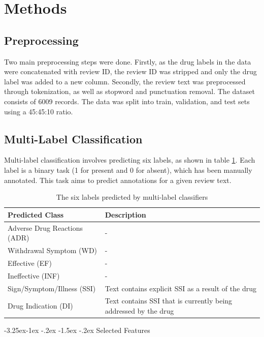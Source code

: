 \documentclass[10.7pt, twocolumn]{article}
\makeatletter
\renewcommand\subsubsection{\@startsection{subsubsection}{3}{\z@}%
	{-3.25ex\@plus -1ex \@minus -.2ex}%
    {-1.5ex \@plus -.2ex}%
    {\normalfont\itshape}}
\makeatother
\begin{document}
\section{Methods}\label{methods}
\subsection{Preprocessing}
Two main preprocessing steps were done. Firstly, as the drug labels in the data were concatenated with review ID, the review ID was stripped and only the drug label was added to a new column. Secondly, the review text was preprocessed through tokenization, as well as stopword and punctuation removal. The dataset consists of 6009 records. The data was split into train, validation, and test sets using a 45:45:10 ratio.
\subsection{Multi-Label Classification}
Multi-label classification involves predicting six labels, as shown in table \ref{tab:6Labels}. Each label is a binary task (1 for present and 0 for absent), which has been manually annotated. This task aims to predict annotations for a given review text.

\begin{table}[H]
  \centering
  \begin{tabular}{|p{4cm}|p{3cm}|}
    \hline
    \textbf{Predicted Class} & \textbf{Description} \\
    \hline
    Adverse Drug Reactions (ADR) & - \\
    \hline
    Withdrawal Symptom (WD) & - \\
    \hline
    Effective (EF) & - \\
    \hline
    Ineffective (INF) & - \\
    \hline
    Sign/Symptom/Illness (SSI) & Text contains explicit SSI as a result of the drug \\
    \hline
    Drug Indication (DI) & Text contains SSI that is currently being addressed by the drug \\
    \hline
  \end{tabular}
  \caption{The six labels predicted by multi-label classifiers}
  \label{tab:6Labels}
\end{table}

\subsubsection{Selected Features}
\end{document}
